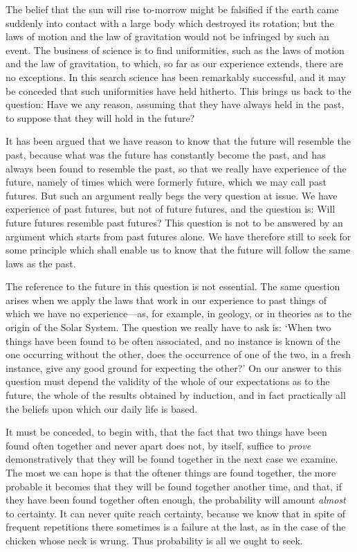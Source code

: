 \documentclass[oneside,letterpaper,12pt]{book}
\begin{document}
The belief that the sun will rise to-morrow might be falsified if the
earth came suddenly into contact with a large body which destroyed its
rotation; but the laws of motion and the law of gravitation would not be
infringed by such an event. The business of science is to find
uniformities, such as the laws of motion and the law of gravitation, to
which, so far as our experience extends, there are no exceptions. In
this search science has been remarkably successful, and it may be
conceded that such uniformities have held hitherto. This brings us back
to the question: Have we any reason, assuming that they have always held
in the past, to suppose that they will hold in the future?

It has been argued that we have reason to know that the future will
resemble the past, because what was the future has constantly become the
past, and has always been found to resemble the past, so that we really
have experience of the future, namely of times which were formerly
future, which we may call past futures. But such an argument really begs
the very question at issue. We have experience of past futures, but not
of future futures, and the question is: Will future futures resemble
past futures? This question is not to be answered by an argument which
starts from past futures alone. We have therefore still to seek for some
principle which shall enable us to know that the future will follow the
same laws as the past.

The reference to the future in this question is not essential. The same
question arises when we apply the laws that work in our experience to
past things of which we have no experience---as, for example, in
geology, or in theories as to the origin of the Solar System. The
question we really have to ask is: `When two things have
been found to be often associated, and no instance is known of the one
occurring without the other, does the occurrence of one of the two, in a
fresh instance, give any good ground for expecting the
other?' On our answer to this question must depend the
validity of the whole of our expectations as to the future, the whole of
the results obtained by induction, and in fact practically all the
beliefs upon which our daily life is based.

It must be conceded, to begin with, that the fact that two things have
been found often together and never apart does not, by itself, suffice
to \emph{prove} demonstratively that they will be found together in the
next case we examine. The most we can hope is that the oftener things
are found together, the more probable it becomes that they will be found
together another time, and that, if they have been found together often
enough, the probability will amount \emph{almost} to certainty. It can
never quite reach certainty, because we know that in spite of frequent
repetitions there sometimes is a failure at the last, as in the case of
the chicken whose neck is wrung. Thus probability is all we ought to
seek.
\end{document}
